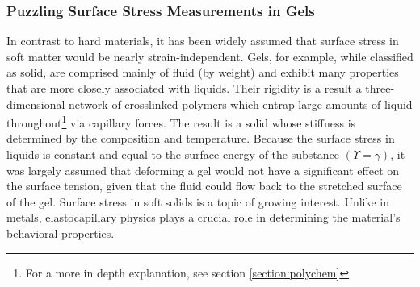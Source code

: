 
\subsubsection{Puzzling Surface Stress Measurements in Gels}
In contrast to hard materials, it has been widely assumed that surface stress in soft matter would be nearly strain-independent. Gels, for example, while classified as solid, are comprised mainly of fluid (by weight) and exhibit many properties that are more closely associated with liquids. Their rigidity is a result a three-dimensional network of crosslinked polymers which entrap large amounts of liquid throughout\footnote{For a more in depth explanation, see section \ref{section:polychem}} via capillary forces. The result is a solid whose stiffness is determined by the composition and temperature. Because the surface stress in liquids is constant and equal to the surface energy of the substance $(\Upsilon = \gamma)$, it was largely assumed that deforming a gel would not have a significant effect on the surface tension, given that the fluid could flow back to the stretched surface of the gel. Surface stress in soft solids is a topic of growing interest. Unlike in metals, elastocapillary physics plays a crucial role in determining the material's behavioral properties.  

